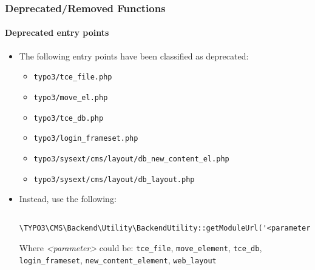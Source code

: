 \begin{frame}[fragile]
	\frametitle{Deprecated/Removed Functions}
	\framesubtitle{Deprecated entry points}

	\begin{itemize}
		\item The following entry points have been classified as deprecated:

			\begin{itemize}
				\item \texttt{typo3/tce\_file.php}
				\item \texttt{typo3/move\_el.php}
				\item \texttt{typo3/tce\_db.php}
				\item \texttt{typo3/login\_frameset.php}
				\item \texttt{typo3/sysext/cms/layout/db\_new\_content\_el.php}
				\item \texttt{typo3/sysext/cms/layout/db\_layout.php}
			\end{itemize}

		\item Instead, use the following:
			\begin{lstlisting}
				\TYPO3\CMS\Backend\Utility\BackendUtility::getModuleUrl('<parameter>')
			\end{lstlisting}

			Where \textit{<parameter>} could be:\newline
				\small
					\texttt{tce\_file}, \texttt{move\_element}, \texttt{tce\_db},
					\texttt{login\_frameset}, \texttt{new\_content\_element}, \texttt{web\_layout}
				\normalsize
	\end{itemize}

\end{frame}


